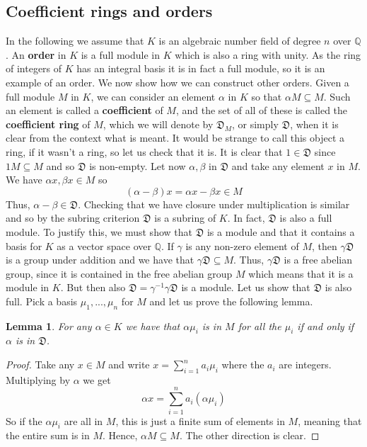 \documentclass{article}
\newtheorem{lemma}{Lemma}[section]
\newcommand{\mfrak}[1]{\mathfrak{#1}}
\newcommand{\mbb}[1]{\mathbb{#1}}
\numberwithin{equation}{section}
\begin{document}
\subsection{Coefficient rings and orders}
In the following we assume that $K$ is an algebraic number field of degree $n$ over $\mbb Q$. An \textbf{order} in $K$ is a full module in $K$ which is also a ring with unity. As the ring of integers of $K$ has an integral basis it is in fact a full module, so it is an example of an order. We now show how we can construct other orders. Given a full module $M$ in $K$, we can consider an element $\alpha$ in $K$ so that $\alpha M \subseteq M$. Such an element is called a \textbf{coefficient} of $M$, and the set of all of these is called the \textbf{coefficient ring} of $M$, which we will denote by $\mfrak D_M$, or simply $\mfrak D$, when it is clear from the context what is meant. It would be strange to call this object a ring, if it wasn't a ring, so let us check that it is. It is clear that $1 \in \mfrak{D}$ since $1 M \subseteq M$ and so $\mfrak{D}$ is non-empty. Let now $\alpha, \beta$ in $\mfrak D$ and take any element $x$ in $M$. We have $\alpha x, \beta x \in M$ so $$(\alpha - \beta)x = \alpha x - \beta x \in M$$
Thus, $\alpha - \beta \in \mfrak{D}$. Checking that we have closure under multiplication is similar and so by the subring criterion $\mfrak{D}$ is a subring of $K$. In fact, $\mfrak{D}$ is also a full module. To justify this, we must show that $\mfrak{D}$ is a module and that it contains a basis for $K$ as a vector space over $\mbb Q$. If $\gamma$ is any non-zero element of $M$, then $\gamma \mfrak{D}$ is a group under addition and we have that $\gamma \mfrak{D} \subseteq M$. Thus, $\gamma \mfrak D$ is a free abelian group, since it is contained in the free abelian group $M$ which means that it is a module in $K$. But then also $\mfrak{D} = \gamma^{-1} \gamma \mfrak{D}$ is a module. Let us show that $\mfrak D$ is also full. Pick a basis $\mu_1, ..., \mu_n$ for $M$ and let us prove the following lemma.
\begin{lemma}\label{lem:SufficientConditionForCoefficient}
	For any $\alpha \in K$ we have that $\alpha \mu_i$ is in $M$ for all the $\mu_i$ if and only if $\alpha$ is in $\mfrak D$.
\end{lemma}
\begin{proof}
	Take any $x \in M$ and write $x = \sum_{i=1}^n a_i \mu_i$ where the $a_i$ are integers. Multiplying by $\alpha$ we get
	$$\alpha x = \sum_{i=1}^n a_i (\alpha \mu_i)$$
	So if the $\alpha \mu_i$ are all in $M$, this is just a finite sum of elements in $M$, meaning that the entire sum is in $M$. Hence, $\alpha M \subseteq M$. The other direction is clear.
\end{proof}
\end{document}
